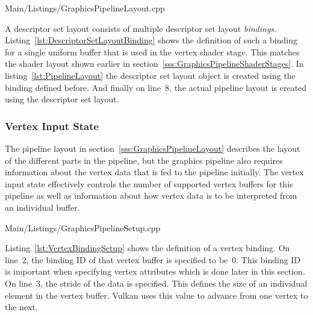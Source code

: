         
        {Main/Listings/GraphicsPipelineLayout.cpp}

        A descriptor set layout consists of multiple descriptor set layout \textit{bindings}.
        Listing~\ref{lst:DescriptorSetLayoutBinding} shows the definition of such a binding for a single uniform buffer that is used in the vertex shader stage.
        This matches the shader layout shown earlier in section~\ref{sss:GraphicsPipelineShaderStages}.
        In listing~\ref{lst:PipelineLayout} the descriptor set layout object is created using the binding defined before.
        And finally on line~8, the actual pipeline layout is created using the descriptor set layout.

      \subsubsection{Vertex Input State}
      \label{sss:VertexInputStateSetup}
        The pipeline layout in section~\ref{sss:GraphicsPipelineLayout} describes the layout of the different parts in the pipeline, but the graphics pipeline also requires information about the vertex data that is fed to the pipeline initially.
        The vertex input state effectively controls the number of supported vertex buffers for this pipeline as well as information about how vertex data is to be interpreted from an individual buffer.

        
        {Main/Listings/GraphicsPipelineSetup.cpp}

        Listing~\ref{lst:VertexBindingSetup} shows the definition of a vertex binding.
        On line~2, the binding ID of that vertex buffer is specified to be~0.
        This binding ID is important when specifying vertex attributes which is done later in this section.
        On line~3, the stride of the data is specified.
        This defines the size of an individual element in the vertex buffer.
        Vulkan uses this value to advance from one vertex to the next.

